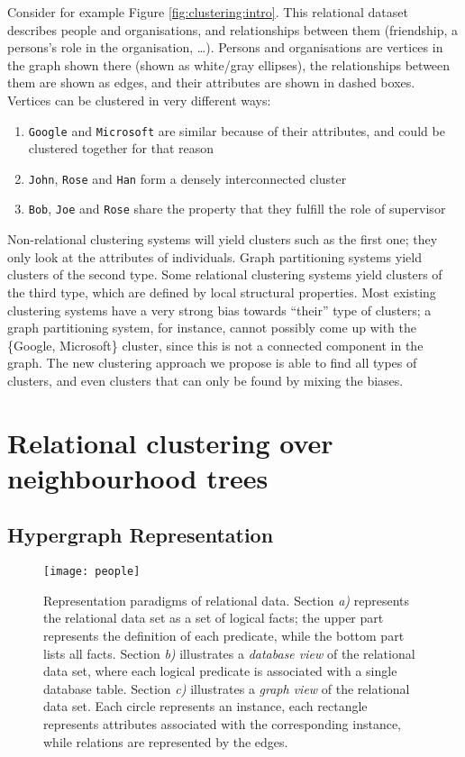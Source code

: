 Consider for example Figure \ref{fig:clustering:intro}.
This relational dataset describes people and organisations, and relationships between them (friendship, a persons’s role in the organisation, \ldots).   
Persons and organisations are vertices in the graph shown there (shown as white/gray ellipses), the relationships between them are shown as edges, and their attributes are shown in dashed boxes.  
Vertices can be clustered in very different ways:
\begin{enumerate}
    \item {\tt Google} and {\tt Microsoft} are similar because of their attributes, and could be clustered together for that reason
    \item {\tt John}, {\tt Rose} and {\tt Han} form a densely interconnected cluster
    \item {\tt Bob}, {\tt Joe} and {\tt Rose} share the property that they fulfill the role of supervisor
\end{enumerate}
Non-relational clustering systems will yield clusters such as the first one; they only look at the attributes of individuals.  
Graph partitioning systems yield clusters of the second type.  
Some relational clustering systems yield clusters of the third type, which are defined by local structural properties.  
Most existing clustering systems have a very strong bias towards ``their'' type of clusters; a graph partitioning system, for instance, cannot possibly come up with the \{Google, Microsoft\} cluster, since this is not a connected component in the graph.  
The new clustering approach we propose is able to find all types of clusters, and even clusters that can only be found by mixing the biases.








\section{Relational clustering over neighbourhood trees}
\label{sec:Approach}



\subsection{Hypergraph Representation}

\begin{figure}
  \centering
  \medskip
  \texttt{[image: people]}
  \caption{Representation paradigms of relational data. Section \textit{a)} represents the relational data set as a set of logical facts; the upper part represents the definition of each predicate, while the bottom part lists all facts. Section \textit{b)} illustrates a \textit{database view} of the relational data set, where each logical predicate is associated with a single database table.  Section \textit{c)}  illustrates a \textit{graph view} of the relational data set. Each circle represents an instance, each rectangle represents attributes associated with the corresponding instance, while relations are represented by the edges.}
  \label{fig:clustering:people}
\end{figure}

